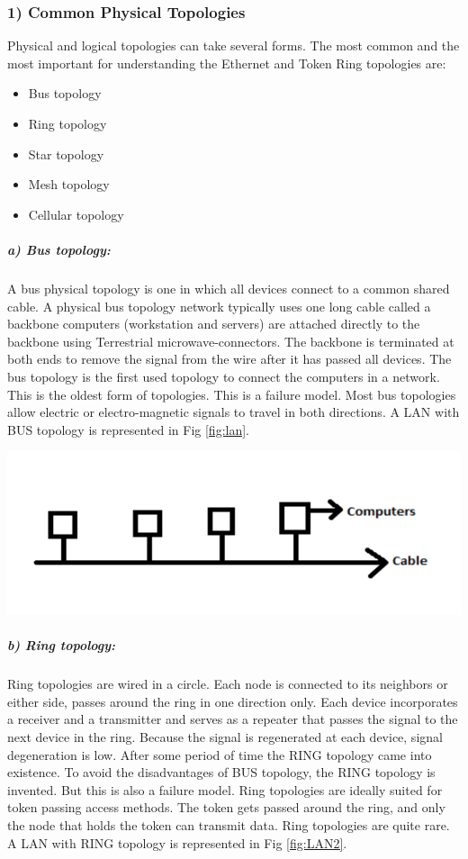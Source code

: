 \documentclass[12pt]{article}
\newenvironment{Figure}
  {\par\medskip\noindent\minipage{\linewidth}}
  {\endminipage\par\medskip}
\begin{document}
\begin{multicols*}{2}
\subsubsection*{1) Common Physical Topologies}
Physical and logical topologies can take several
forms. The most common and the most important for
understanding the Ethernet and Token Ring topologies
are:
\begin{itemize}
  \item Bus topology
  \item Ring topology
  \item Star topology
  \item Mesh topology
  \item Cellular topology
\end{itemize}

\subparagraph{a) Bus topology:}
\indent A bus physical topology is one in which all
devices connect to a common shared cable. A physical
bus topology network typically uses one long cable
called a backbone computers (workstation and servers)
are attached directly to the backbone using Terrestrial
microwave-connectors. The backbone is terminated at
both ends to remove the signal from the wire after it has
passed all devices. The bus topology is the first used
topology to connect the computers in a network. This is
the oldest form of topologies. This is a failure model.
Most bus topologies allow electric or electro-magnetic
signals to travel in both directions. A LAN with BUS
topology is represented in Fig \ref{fig:lan}.

\begin{Figure}
 \centering
 \includegraphics[width=\linewidth]{bus.png}
\label{fig:lan}
\end{Figure}

\subparagraph{b) Ring topology:}
\indent Ring topologies are wired in a circle. Each node
is connected to its neighbors or either side, passes
around the ring in one direction only. Each device
incorporates a receiver and a transmitter and serves as a
repeater that passes the signal to the next device in the
ring. Because the signal is regenerated at each device, signal degeneration is low. After some period of time
the RING topology came into existence. To avoid the
disadvantages of BUS topology, the RING topology is
invented. But this is also a failure model. Ring
topologies are ideally suited for token passing access
methods. The token gets passed around the ring, and
only the node that holds the token can transmit data.
Ring topologies are quite rare. A LAN with RING
topology is represented in Fig \ref{fig:LAN2}.


\end{multicols*}
\end{document}

